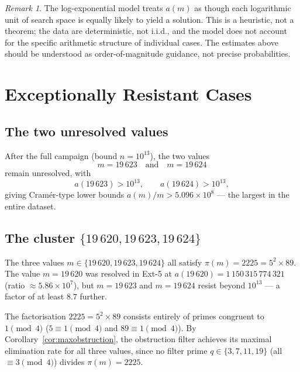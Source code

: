 \documentclass{amsart}
\theoremstyle{definition}
\theoremstyle{remark}
\newtheorem{remark}[theorem]{Remark}
\numberwithin{equation}{section}
\begin{document}
\begin{remark}
The log-exponential model treats $a(m)$ as though each logarithmic
unit of search space is equally likely to yield a solution.  This is
a heuristic, not a theorem; the data are deterministic, not i.i.d.,
and the model does not account for the specific arithmetic structure
of individual cases.  The estimates above should be understood as
order-of-magnitude guidance, not precise probabilities.
\end{remark}

\section{Exceptionally Resistant Cases}
\label{sec:exceptional}

\subsection{The two unresolved values}

After the full campaign (bound $n = 10^{13}$), the two values
\begin{equation}\label{eq:open}
m = 19\,623 \quad\text{and}\quad m = 19\,624
\end{equation}
remain unresolved, with
\[
a(19\,623) > 10^{13}, \qquad a(19\,624) > 10^{13},
\]
giving Cram\'er-type lower bounds
$a(m)/m > 5.096 \times 10^8$ --- the largest in the entire dataset.

\subsection{The cluster $\{19\,620, 19\,623, 19\,624\}$}

The three values $m \in \{19\,620, 19\,623, 19\,624\}$ all satisfy
$\pi(m) = 2225 = 5^2 \times 89$.  The value $m = 19\,620$ was
resolved in Ext-5 at $a(19\,620) = 1\,150\,315\,774\,321$
(ratio $\approx 5.86 \times 10^7$), but $m = 19\,623$ and
$m = 19\,624$ resist beyond $10^{13}$ --- a factor of at least
$8.7$ further.

The factorisation $2225 = 5^2 \times 89$ consists entirely of
primes congruent to $1 \pmod{4}$ ($5 \equiv 1 \pmod{4}$ and
$89 \equiv 1 \pmod{4}$).  By Corollary~\ref{cor:maxobstruction},
the obstruction filter achieves its maximal elimination rate for
all three values, since no filter prime $q \in \{3, 7, 11, 19\}$
(all $\equiv 3 \pmod{4}$) divides $\pi(m) = 2225$.
\end{document}
